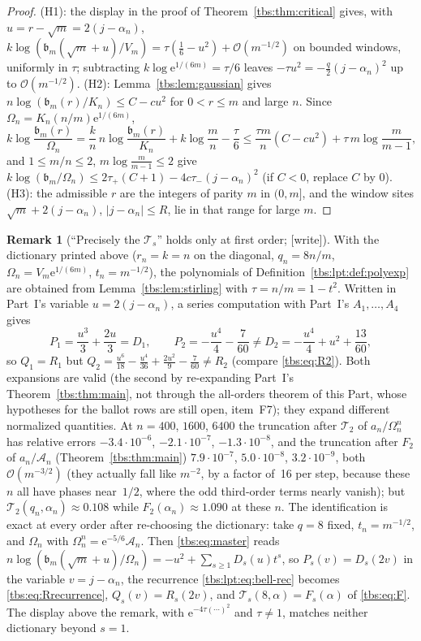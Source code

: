 \documentclass[11pt,a4paper]{article}
\numberwithin{equation}{section}
\theoremstyle{definition}
\newtheorem{remark}[theorem]{Remark}
\newcommand{\Acal}{\mathcal A}
\newcommand{\bcont}{\mathfrak b}
\newcommand{\ee}{\mathrm e}
\newcommand{\OO}{\mathcal O}
\begin{document}
\begin{proof}
(H1): the display in the proof of Theorem~\ref{tbs:thm:critical} gives,
with $u=r-\sqrt m=2(j-\alpha_n)$,
$k\log(\bcont_m(\sqrt m+u)/V_m)=\tau(\frac16-u^2)+\OO(m^{-1/2})$ on
bounded windows, uniformly in $\tau$; subtracting
$k\log\ee^{1/(6m)}=\tau/6$ leaves $-\tau u^2=-\frac q2(j-\alpha_n)^2$ up
to $\OO(m^{-1/2})$. (H2): Lemma~\ref{tbs:lem:gaussian} gives
$n\log(\bcont_m(r)/K_n)\le C-cu^2$ for $0<r\le m$ and large $n$. Since
$\Omega_n=K_n(n/m)\ee^{1/(6m)}$,
\[
 k\log\frac{\bcont_m(r)}{\Omega_n}
 =\frac{k}{n}\,n\log\frac{\bcont_m(r)}{K_n}+k\log\frac mn-\frac\tau6
 \le\frac{\tau m}{n}(C-cu^2)+\tau\,m\log\frac{m}{m-1},
\]
and $1\le m/n\le2$, $m\log\frac m{m-1}\le2$ give
$k\log(\bcont_m/\Omega_n)\le2\tau_+(C+1)-4c\tau_-(j-\alpha_n)^2$ (if
$C<0$, replace $C$ by $0$). (H3): the admissible $r$ are the integers of
parity $m$ in $(0,m]$, and the window sites
$\sqrt m+2(j-\alpha_n)$, $|j-\alpha_n|\le R$, lie in that range for
large $m$.
\end{proof}

\begin{remark}[``Precisely the $\mathcal T_s$'' holds only at first order; {[write]}]\label{tbs:lpt:rem:precisely}
With the dictionary printed above ($r_n=k=n$ on the diagonal, $q_n=8n/m$,
$\Omega_n=V_m\ee^{1/(6m)}$, $t_n=m^{-1/2}$), the polynomials of
Definition~\ref{tbs:lpt:def:polyexp} are obtained from
Lemma~\ref{tbs:lem:stirling} with $\tau=n/m=1-t^2$. Written in Part~I's
variable $u=2(j-\alpha_n)$, a series computation with Part~I's
$A_1,\dots,A_4$ gives
\[
 P_1=\frac{u^3}3+\frac{2u}3=D_1,\qquad
 P_2=-\frac{u^4}4-\frac7{60}\ne D_2=-\frac{u^4}4+u^2+\frac{13}{60},
\]
so $Q_1=R_1$ but
$Q_2=\frac{u^6}{18}-\frac{u^4}{36}+\frac{2u^2}9-\frac7{60}\ne R_2$
(compare \eqref{tbs:eq:R2}). Both expansions are valid (the second by
re-expanding Part~I's Theorem~\ref{tbs:thm:main}, not through the
all-orders theorem of this Part, whose hypotheses for the ballot rows are
still open, item~F7); they expand different normalized quantities. At $n=400$, $1600$, $6400$ the
truncation after $\mathcal T_2$ of $a_n/\Omega_n^n$ has relative errors
$-3.4\cdot10^{-6}$, $-2.1\cdot10^{-7}$, $-1.3\cdot10^{-8}$, and the
truncation after $F_2$ of $a_n/\Acal_n$ (Theorem~\ref{tbs:thm:main})
$7.9\cdot10^{-7}$, $5.0\cdot10^{-8}$, $3.2\cdot10^{-9}$, both
$\OO(m^{-3/2})$ (they actually fall like $m^{-2}$, by a factor of~16 per
step, because these $n$ all have phases near~$1/2$, where the odd
third-order terms nearly vanish); but $\mathcal T_2(q_n,\alpha_n)\approx0.108$ while
$F_2(\alpha_n)\approx1.090$ at these $n$. The identification is exact at
every order after re-choosing the dictionary: take $q=8$ fixed,
$t_n=m^{-1/2}$, and $\Omega_n$ with $\Omega_n^n=\ee^{-5/6}\Acal_n$. Then
\eqref{tbs:eq:master} reads
$n\log(\bcont_m(\sqrt m+u)/\Omega_n)=-u^2+\sum_{s\ge1}D_s(u)t^s$, so
$P_s(v)=D_s(2v)$ in the variable $v=j-\alpha_n$, the recurrence
\eqref{tbs:lpt:eq:bell-rec} becomes \eqref{tbs:eq:Rrecurrence},
$Q_s(v)=R_s(2v)$, and $\mathcal T_s(8,\alpha)=F_s(\alpha)$ of
\eqref{tbs:eq:F}. The display above the remark, with
$\ee^{-4\tau(\cdots)^2}$ and $\tau\ne1$, matches neither dictionary
beyond $s=1$.
\end{remark}
\end{document}
